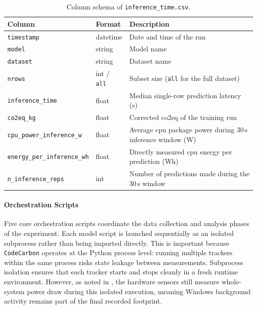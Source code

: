 \begin{table}[htbp]
\centering
\small
\caption{Column schema of \texttt{inference\_time.csv}.}
\label{tab:inference_schema}
\begin{tabularx}{\linewidth}{@{} l l X @{}}
\toprule
\textbf{Column} & \textbf{Format} & \textbf{Description} \\
\midrule
\texttt{timestamp}              & datetime           & Date and time of the run \\
\texttt{model}                  & string             & Model name \\
\texttt{dataset}                & string             & Dataset name \\
\texttt{nrows}                  & int / \texttt{all} & Subset size (\texttt{all} for the full dataset) \\
\texttt{inference\_time}           & float              & Median single-row prediction latency (s) \\
\texttt{co2eq\_kg}                 & float              & Corrected \gls{co2eq} of the training run \\
\texttt{cpu\_power\_inference\_w}  & float              & Average \gls{cpu} package power during 30\,s inference window (W) \\
\texttt{energy\_per\_inference\_wh} & float             & Directly measured \gls{cpu} energy per prediction (Wh) \\
\texttt{n\_inference\_reps}        & int                & Number of predictions made during the 30\,s window \\
\bottomrule
\end{tabularx}
\end{table}

\paragraph{Orchestration Scripts}
Five core orchestration scripts coordinate the data collection and analysis phases of the experiment. Each model script is launched sequentially as an isolated subprocess rather than being imported directly. This is important because \texttt{CodeCarbon} operates at the Python process level: running multiple trackers within the same process risks state leakage between measurements. Subprocess isolation ensures that each tracker starts and stops cleanly in a fresh runtime environment. However, as noted in , the hardware sensors still measure whole-system power draw during this isolated execution, meaning Windows background activity remains part of the final recorded footprint.

